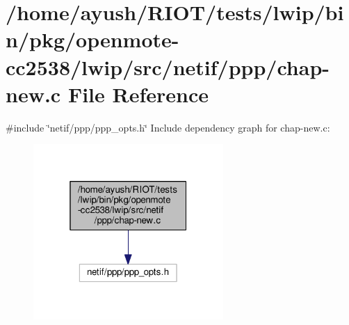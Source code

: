 \hypertarget{openmote-cc2538_2lwip_2src_2netif_2ppp_2chap-new_8c}{}\section{/home/ayush/\+R\+I\+O\+T/tests/lwip/bin/pkg/openmote-\/cc2538/lwip/src/netif/ppp/chap-\/new.c File Reference}
\label{openmote-cc2538_2lwip_2src_2netif_2ppp_2chap-new_8c}
{\ttfamily \#include \char`\"{}netif/ppp/ppp\+\_\+opts.\+h\char`\"{}}\newline
Include dependency graph for chap-\/new.c\+:
\nopagebreak
\begin{figure}[H]
\begin{center}
\leavevmode
\includegraphics[width=205pt]{openmote-cc2538_2lwip_2src_2netif_2ppp_2chap-new_8c__incl}
\end{center}
\end{figure}
